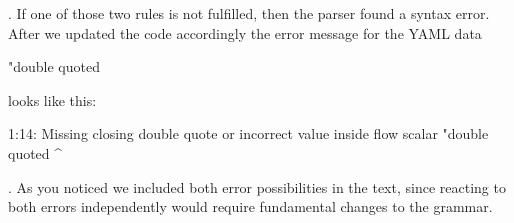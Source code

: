. If one of those two rules is not fulfilled, then the parser found a syntax error. After we updated the code accordingly the error message for the YAML data

\begin{yamlcode}
  "double quoted
\end{yamlcode}

looks like this:

\begin{textcode}
  1:14: Missing closing double quote or incorrect value inside flow scalar
        "double quoted
                      ^
\end{textcode}

. As you noticed we included both error possibilities in the text, since reacting to both errors independently would require fundamental changes to the grammar.
